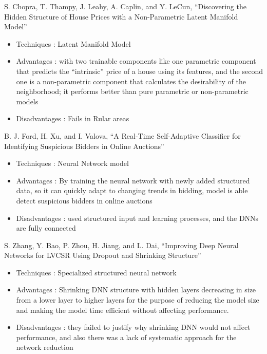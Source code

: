\documentclass[11pt,fleqn]{book} %
\begin{document}
\begin{remark}
    S. Chopra, T. Thampy, J. Leahy, A. Caplin, and Y. LeCun, “Discovering the Hidden Structure of House Prices with a Non-Parametric Latent Manifold Model”
    \begin{itemize}
        \item Techniques : Latent Manifold Model
        \item Advantages : with two trainable components like one parametric component that predicts the “intrinsic” price of a house using its features, and the second one is a non-parametric component that calculates the desirability of the neighborhood; it performs better than pure parametric or non-parametric models
        \item Disadvantages : Fails in Rular areas
    \end{itemize}
\end{remark}


\begin{remark}
    B. J. Ford, H. Xu, and I. Valova, “A Real-Time Self-Adaptive Classifier for Identifying Suspicious Bidders in Online Auctions”
    \begin{itemize}
        \item Techniques : Neural Network model
        \item Advantages : By training the neural network with newly added structured data, so it can quickly adapt to changing trends in bidding, model is able detect suspicious bidders in online auctions
        \item Disadvantages : used structured input and learning processes, and the DNNs are fully connected
    \end{itemize}
\end{remark}


\begin{remark}
    S. Zhang, Y. Bao, P. Zhou, H. Jiang, and L. Dai, “Improving Deep Neural Networks for LVCSR Using Dropout and Shrinking Structure”
    \begin{itemize}
        \item Techniques : Specialized structured neural network
        \item Advantages : Shrinking DNN structure with hidden layers decreasing in size from a lower layer to higher layers for the purpose of reducing the model size and making the model time
efficient without affecting performance.
        \item Disadvantages : they failed to justify why shrinking DNN would not affect performance, and also there was a lack of systematic approach for the network reduction
    \end{itemize}
\end{remark}
\end{document}
